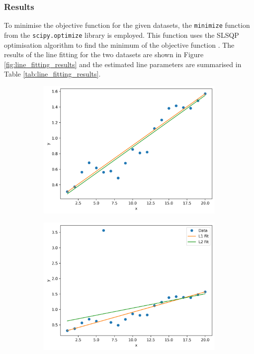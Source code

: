\documentclass[11pt]{article}
\begin{document}
\subsubsection{Results}
To minimise the objective function for the given datasets, the \texttt{minimize} function from the \texttt{scipy.optimize} library is employed. This function uses the SLSQP optimisation algorithm to find the minimum of the objective function \cite{Kraft1988}. The results of the line fitting for the two datasets are shown in Figure \ref{fig:line_fitting_results} and the estimated line parameters are summarised in Table \ref{tab:line_fitting_results}.

\begin{figure}[H]
    \centering
    \begin{subfigure}{.45\textwidth}
        \centering
        \includegraphics[width=\linewidth]{figs/q2a_fitted_line_1.png}
        \caption{}
        \label{fig:line_fit_1}
    \end{subfigure}%
    \begin{subfigure}{.45\textwidth}
        \centering
        \includegraphics[width=\linewidth]{figs/q2a_fitted_line_2.png}

\end{subfigure}
\end{figure}
\end{document}
